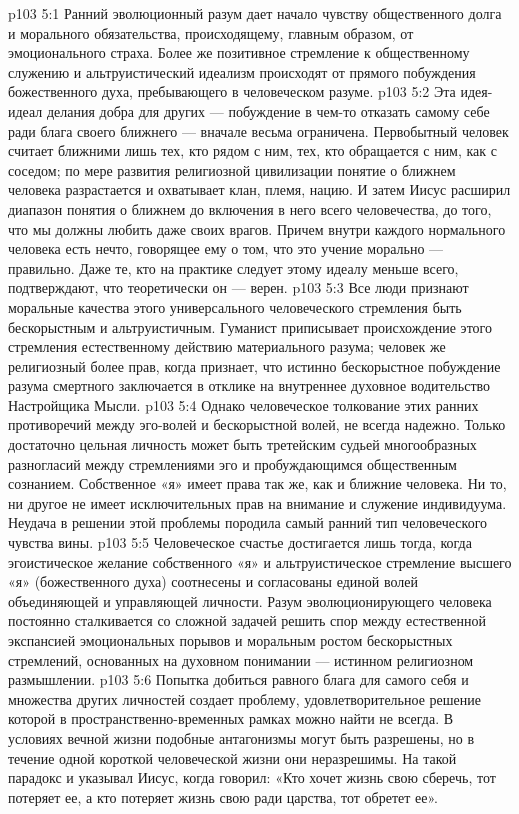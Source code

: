 \vs p103 5:1 Ранний эволюционный разум дает начало чувству общественного долга и морального обязательства, происходящему, главным образом, от эмоционального страха. Более же позитивное стремление к общественному служению и альтруистический идеализм происходят от прямого побуждения божественного духа, пребывающего в человеческом разуме.
\vs p103 5:2 Эта идея\hyp{}идеал делания добра для других --- побуждение в чем\hyp{}то отказать самому себе ради блага своего ближнего --- вначале весьма ограничена. Первобытный человек считает ближними лишь тех, кто рядом с ним, тех, кто обращается с ним, как с соседом; по мере развития религиозной цивилизации понятие о ближнем человека разрастается и охватывает клан, племя, нацию. И затем Иисус расширил диапазон понятия о ближнем до включения в него всего человечества, до того, что мы должны любить даже своих врагов. Причем внутри каждого нормального человека есть нечто, говорящее ему о том, что это учение морально --- правильно. Даже те, кто на практике следует этому идеалу меньше всего, подтверждают, что теоретически он --- верен.
\vs p103 5:3 Все люди признают моральные качества этого универсального человеческого стремления быть бескорыстным и альтруистичным. Гуманист приписывает происхождение этого стремления естественному действию материального разума; человек же религиозный более прав, когда признает, что истинно бескорыстное побуждение разума смертного заключается в отклике на внутреннее духовное водительство Настройщика Мысли.
\vs p103 5:4 Однако человеческое толкование этих ранних противоречий между эго\hyp{}волей и бескорыстной волей, не всегда надежно. Только достаточно цельная личность может быть третейским судьей многообразных разногласий между стремлениями эго и пробуждающимся общественным сознанием. Собственное «я» имеет права так же, как и ближние человека. Ни то, ни другое не имеет исключительных прав на внимание и служение индивидуума. Неудача в решении этой проблемы породила самый ранний тип человеческого чувства вины.
\vs p103 5:5 Человеческое счастье достигается лишь тогда, когда эгоистическое желание собственного «я» и альтруистическое стремление высшего «я» (божественного духа) соотнесены и согласованы единой волей объединяющей и управляющей личности. Разум эволюционирующего человека постоянно сталкивается со сложной задачей решить спор между естественной экспансией эмоциональных порывов и моральным ростом бескорыстных стремлений, основанных на духовном понимании --- истинном религиозном размышлении.
\vs p103 5:6 Попытка добиться равного блага для самого себя и множества других личностей создает проблему, удовлетворительное решение которой в пространственно\hyp{}временных рамках можно найти не всегда. В условиях вечной жизни подобные антагонизмы могут быть разрешены, но в течение одной короткой человеческой жизни они неразрешимы. На такой парадокс и указывал Иисус, когда говорил: «Кто хочет жизнь свою сберечь, тот потеряет ее, а кто потеряет жизнь свою ради царства, тот обретет ее».
